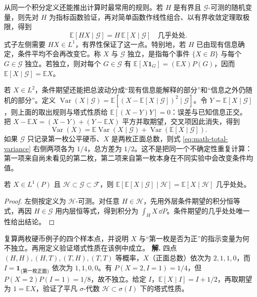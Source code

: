 从同一个积分定义还能推出计算时最常用的规则。若 \(H\) 是有界且 \(\mathcal G\)-可测的随机变量，则先对 \(H\) 为指标函数验证，再对简单函数作线性组合、以有界收敛定理取极限，得到
\[
\mathbb E[HX\mid\mathcal G]
=H\,\mathbb E[X\mid\mathcal G]
\quad\text{几乎处处}.
\]
式子左侧需要 \(HX\in L^1\)，有界性保证了这一点。特别地，若 \(H\) 已由现有信息确定，条件平均不会再改变它。称 \(X\) 与 \(\mathcal G\) 独立，是指每个事件 \(\{X\in B\}\) 与每个 \(G\in\mathcal G\) 独立。若独立，则对每个 \(G\in\mathcal G\) 有
\(\mathbb E[X\mathbf1_G]=(\mathbb EX)P(G)\)，因而
\(\mathbb E[X\mid\mathcal G]=\mathbb EX\)。

若 \(X\in L^2\)，条件期望还能把总波动分成“现有信息能解释的部分”和“信息之外仍随机的部分”。定义
\(\operatorname{Var}(X\mid\mathcal G)
=\mathbb E[(X-\mathbb E[X\mid\mathcal G])^2\mid\mathcal G]\)。令
\(Y=\mathbb E[X\mid\mathcal G]\)，则上面的取出规则与塔式性质给
\(\mathbb E[(X-Y)Y]=0\)：误差与已知信息正交。把
\(X-\mathbb EX=(X-Y)+(Y-\mathbb EX)\) 平方并取期望，交叉项因此消失，得到
\begin{equation}
\label{eq:math-total-variance}
\operatorname{Var}(X)
=\mathbb E\operatorname{Var}(X\mid\mathcal G)
+\operatorname{Var}(\mathbb E[X\mid\mathcal G]).
\end{equation}
如果 \(\mathcal G\) 只记录第一枚公平硬币、\(X\) 是两枚正面总数，则式 \cref{eq:math-total-variance} 右侧两项各为 \(1/4\)，总方差为 \(1/2\)。这不是把同一个不确定性重复计算：第一项来自尚未看见的第二枚，第二项来自第一枚本身在不同实验中会改变条件均值。

\begin{proposition}[条件期望的塔式性质]
若 \(X\in L^1(P)\) 且 \(\mathcal H\subset\mathcal G\subset\mathcal F\)，则
\(\mathbb E[\mathbb E[X\mid\mathcal G]\mid\mathcal H]
=\mathbb E[X\mid\mathcal H]\) 几乎处处。
\end{proposition}
\begin{proof}
左侧按定义为 \(\mathcal H\)-可测。对任意 \(H\in\mathcal H\)，先用外层条件期望的积分恒等式，再因 \(H\in\mathcal G\) 用内层恒等式，得到积分为 \(\int_HX\,\dd P\)。条件期望的几乎处处唯一性给出结论。
\end{proof}



\par
\begin{workedexample}
复算两枚硬币例子的四个样本点，并说明 \(X\) 与“第一枚是否为正”的指示变量为何不独立。再用定义验证塔式性质在该例中成立。
\textbf{解.} 四点 \((H,H),(H,T),(T,H),(T,T)\) 等概率，\(X\)（正面总数）依次为 \(2,1,1,0\)，而 \(I=\mathbf1_{\{\text{第一枚正面}\}}\) 依次为 \(1,1,0,0\)。有 \(P(X=2,I=1)=1/4\)，但 \(P(X=2)P(I=1)=1/8\)，故不独立。给定 \(I\)，\(\mathbb E[X\mid I]=I+1/2\)，再取期望为 \(1=\mathbb EX\)，验证了平凡 \(\sigma\)-代数 \(\mathcal H\subset\sigma(I)\) 下的塔式性质。
\end{workedexample}
\par
